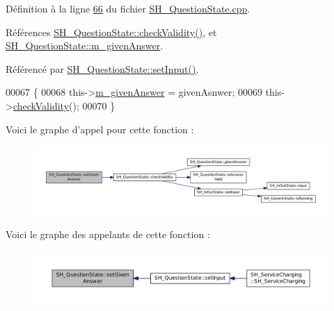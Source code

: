 Définition à la ligne \hyperlink{SH__QuestionState_8cpp_source_l00066}{66} du fichier \hyperlink{SH__QuestionState_8cpp_source}{S\-H\-\_\-\-Question\-State.\-cpp}.



Références \hyperlink{classSH__QuestionState_a902be003650c33d954d707b2d3ee0bb9}{S\-H\-\_\-\-Question\-State\-::check\-Validity()}, et \hyperlink{classSH__QuestionState_a309bb96a6aed67d190f9ab995fdc7c61}{S\-H\-\_\-\-Question\-State\-::m\-\_\-given\-Answer}.



Référencé par \hyperlink{classSH__QuestionState_ab40b6202090d1afcc965e124b2deb88a}{S\-H\-\_\-\-Question\-State\-::set\-Input()}.


\begin{DoxyCode}
00067 \{
00068     this->\hyperlink{classSH__QuestionState_a309bb96a6aed67d190f9ab995fdc7c61}{m\_givenAnswer} = givenAsnwer;
00069     this->\hyperlink{classSH__QuestionState_a902be003650c33d954d707b2d3ee0bb9}{checkValidity}();
00070 \}
\end{DoxyCode}


Voici le graphe d'appel pour cette fonction \-:\nopagebreak
\begin{figure}[H]
\begin{center}
\leavevmode
\includegraphics[width=350pt]{classSH__QuestionState_a8fec0a91aed0b2b1699db17169873eb0_cgraph}
\end{center}
\end{figure}




Voici le graphe des appelants de cette fonction \-:\nopagebreak
\begin{figure}[H]
\begin{center}
\leavevmode
\includegraphics[width=350pt]{classSH__QuestionState_a8fec0a91aed0b2b1699db17169873eb0_icgraph}
\end{center}
\end{figure}


